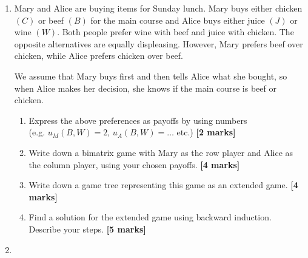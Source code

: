 \documentclass{article}
\begin{document}
\begin{enumerate}
	\newpage




	\item[\textbf{Exercise 3.}]   %

Mary and Alice are buying items for Sunday lunch. Mary buys either chicken $(C)$ or beef $(B)$ for the main course and Alice buys either juice $(J)$ 
or wine $(W)$. Both people prefer wine with beef and juice with chicken. The opposite alternatives are equally displeasing.
However, Mary prefers beef over chicken, while Alice prefers chicken over beef.

We assume that Mary buys first and then tells Alice what she bought,
so when Alice makes her decision, she knows if the main course is beef or chicken.

\begin{enumerate}
\item[(a)] Express the above preferences as payoffs by using numbers\\(e.g.
 $u_M(B,W) = 2$, $u_A(B,W) = \ldots$  etc.)               \hfill{\bf [2 marks]}\smallskip
\item[(b)] Write down a bimatrix game with Mary as the row player 
and Alice as the column player, using your chosen payoffs.           \hfill{\bf [4 marks]}\smallskip
\item[(c)] Write down a game tree representing this game as an extended game.  \hfill{\bf [4 marks]}\smallskip
\item[(d)] Find a solution for the extended game using backward induction.\\Describe your steps.  \hfill{\bf [5 marks]}\smallskip
\end{enumerate}
	\vspace*{0.8cm}


	
	\item[\textbf{Exercise 4.}]  %
	

\end{enumerate}
\end{document}

